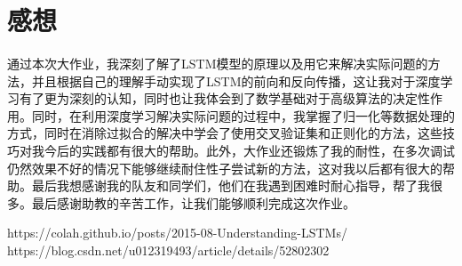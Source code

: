 \documentclass[UTF8]{ctexart}
\begin{document}
\section{感想}
\paragraph*{}
通过本次大作业，我深刻了解了LSTM模型的原理以及用它来解决实际问题的方法，并且根据自己的理解手动实现了LSTM的前向和反向传播，这让我对于深度学习有了更为深刻的认知，同时也让我体会到了数学基础对于高级算法的决定性作用。同时，在利用深度学习解决实际问题的过程中，我掌握了归一化等数据处理的方式，同时在消除过拟合的解决中学会了使用交叉验证集和正则化的方法，这些技巧对我今后的实践都有很大的帮助。此外，大作业还锻炼了我的耐性，在多次调试仍然效果不好的情况下能够继续耐住性子尝试新的方法，这对我以后都有很大的帮助。最后我想感谢我的队友和同学们，他们在我遇到困难时耐心指导，帮了我很多。最后感谢助教的辛苦工作，让我们能够顺利完成这次作业。

\begin{thebibliography}{3}
    https://colah.github.io/posts/2015-08-Understanding-LSTMs/
    https://blog.csdn.net/u012319493/article/details/52802302
    
\end{thebibliography}
\end{document}
